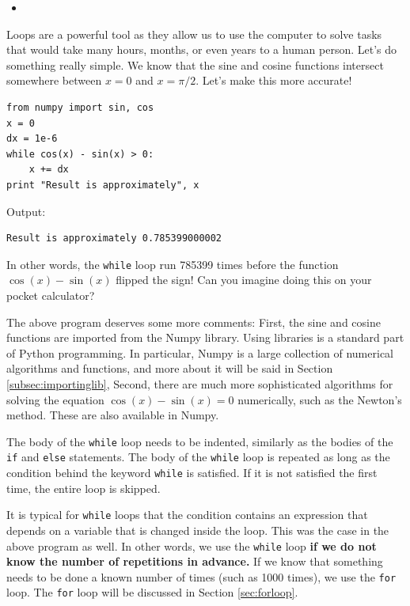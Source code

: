 \begin{itemize}
\item
\end{itemize}

Loops are a powerful tool as they allow us to use the computer to solve
tasks that would take many hours, months, or even years to a human person. 
Let's do something really simple. We know that the sine and cosine functions 
intersect somewhere between $x = 0$ and $x = \pi/2$. Let's make this more accurate!

\begin{verbatim}
from numpy import sin, cos
x = 0
dx = 1e-6
while cos(x) - sin(x) > 0:
    x += dx    
print "Result is approximately", x
\end{verbatim}
Output:

\begin{verbatim}
Result is approximately 0.785399000002
\end{verbatim}
In other words, the {\tt while} loop run 785399 times before 
the function $\cos(x) - \sin(x)$ flipped the sign! Can you 
imagine doing this on your pocket calculator?

The above program deserves some more comments: First, the sine and cosine 
functions are imported from the Numpy library. Using libraries 
is a standard part of Python programming. In particular, Numpy 
is a large collection of numerical algorithms and functions, and 
more about it will be said in Section \ref{subsec:importinglib},
Second, there are much more sophisticated algorithms for solving 
the equation $\cos(x) - \sin(x) = 0$ numerically, such as the Newton's 
method. These are also available in Numpy.

The body of the {\tt while} loop needs to be indented, similarly as
the bodies of the {\tt if} and {\tt else} statements. The body of
the {\tt while} loop
is repeated as long as the condition behind the keyword {\tt while}
is satisfied. If it is not satisfied the first time, the entire 
loop is skipped. 

It is typical for {\tt while} loops that the condition contains 
an expression that depends on a variable that is changed inside the 
loop. This was the case in the above program as well. In other 
words, we use the {\tt while} loop {\bf if we do not know the number of 
repetitions in advance.} If we know that something needs to be done
a known number of times (such as 1000 times), we use the {\tt for} loop.
The {\tt for} loop will be discussed in Section \ref{sec:forloop}.\\

